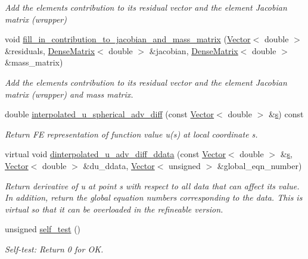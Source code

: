 \begin{DoxyCompactItemize}
\begin{DoxyCompactList}\small\item\em Add the element\textquotesingle{}s contribution to its residual vector and the element Jacobian matrix (wrapper) \end{DoxyCompactList}\item 
void \hyperlink{classoomph_1_1SphericalAdvectionDiffusionEquations_a7aeb7cc67f60d713fd64321004229401}{fill\+\_\+in\+\_\+contribution\+\_\+to\+\_\+jacobian\+\_\+and\+\_\+mass\+\_\+matrix} (\hyperlink{classoomph_1_1Vector}{Vector}$<$ double $>$ \&residuals, \hyperlink{classoomph_1_1DenseMatrix}{Dense\+Matrix}$<$ double $>$ \&jacobian, \hyperlink{classoomph_1_1DenseMatrix}{Dense\+Matrix}$<$ double $>$ \&mass\+\_\+matrix)
\begin{DoxyCompactList}\small\item\em Add the element\textquotesingle{}s contribution to its residual vector and the element Jacobian matrix (wrapper) and mass matrix. \end{DoxyCompactList}\item 
double \hyperlink{classoomph_1_1SphericalAdvectionDiffusionEquations_a25c6b912aba1088ed4759a7523a1d19a}{interpolated\+\_\+u\+\_\+spherical\+\_\+adv\+\_\+diff} (const \hyperlink{classoomph_1_1Vector}{Vector}$<$ double $>$ \&\hyperlink{cfortran_8h_ab7123126e4885ef647dd9c6e3807a21c}{s}) const
\begin{DoxyCompactList}\small\item\em Return FE representation of function value u(s) at local coordinate s. \end{DoxyCompactList}\item 
virtual void \hyperlink{classoomph_1_1SphericalAdvectionDiffusionEquations_aec614fe14108871e1c47345b8cac97d7}{dinterpolated\+\_\+u\+\_\+adv\+\_\+diff\+\_\+ddata} (const \hyperlink{classoomph_1_1Vector}{Vector}$<$ double $>$ \&\hyperlink{cfortran_8h_ab7123126e4885ef647dd9c6e3807a21c}{s}, \hyperlink{classoomph_1_1Vector}{Vector}$<$ double $>$ \&du\+\_\+ddata, \hyperlink{classoomph_1_1Vector}{Vector}$<$ unsigned $>$ \&global\+\_\+eqn\+\_\+number)
\begin{DoxyCompactList}\small\item\em Return derivative of u at point s with respect to all data that can affect its value. In addition, return the global equation numbers corresponding to the data. This is virtual so that it can be overloaded in the refineable version. \end{DoxyCompactList}\item 
unsigned \hyperlink{classoomph_1_1SphericalAdvectionDiffusionEquations_a058fcdc912959c322e704d82d33cde6c}{self\+\_\+test} ()
\begin{DoxyCompactList}\small\item\em Self-\/test\+: Return 0 for OK. \end{DoxyCompactList}\end{DoxyCompactItemize}
